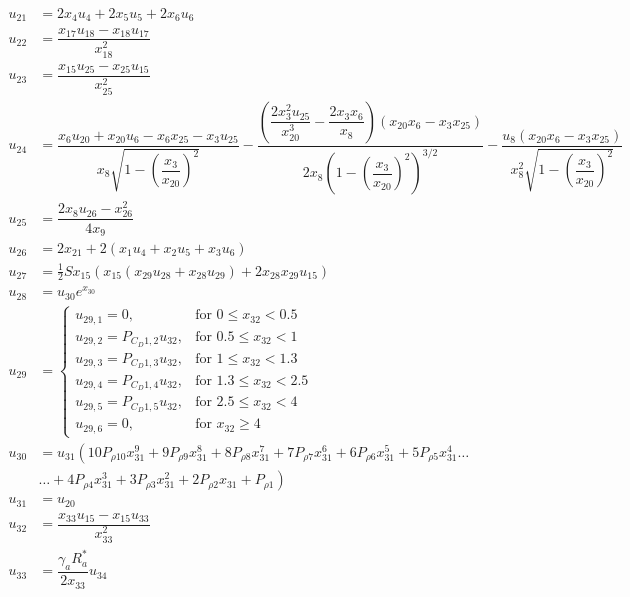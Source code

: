 \begin{equation} \label{eq:unAuxEq2}
\begin{split}
u_{21} &= 2x_{4}u_{4}+2x_{5}u_{5}+2x_{6}u_{6}\\
u_{22} &= \dfrac{x_{17}u_{18}-x_{18}u_{17}}{x_{18}^{2}}\\
u_{23} &= \dfrac{x_{15}u_{25}-x_{25}u_{15}}{x_{25}^{2}}\\
u_{24} &=  \dfrac{x_{6}u_{20}+x_{20}u_{6}-x_{6}x_{25}-x_{3}u_{25}}{x_{8}\sqrt{1-\left(\dfrac{x_{3}}{x_{20}}\right)^{2}}}-\dfrac{\left(\dfrac{2x_{3}^{2}u_{25}}{x_{20}^{3}}-\dfrac{2x_{3}x_{6}}{x_{8}}\right)\left(x_{20}x_{6}-x_{3}x_{25}\right)}{2x_{8}\left(1-\left(\dfrac{x_{3}}{x_{20}}\right)^{2}\right)^{3/2}}-\dfrac{u_{8}\left(x_{20}x_{6}-x_{3}x_{25}\right)}{x_{8}^{2}\sqrt{1-\left(\dfrac{x_{3}}{x_{20}}\right)^{2}}}\\
u_{25} &=  \dfrac{2x_{8}u_{26}-x_{26}^{2}}{4x_{9}}\\
u_{26} &=  2x_{21}+2\left(x_{1}u_{4}+x_{2}u_{5}+x_{3}u_{6}\right)\\
u_{27} &=  \frac{1}{2}Sx_{15}\left(x_{15} \left(x_{29}u_{28}+x_{28}u_{29}\right)+2x_{28}x_{29}u_{15}\right) \\
u_{28} &= u_{30}e^{x_{30}} \\
u_{29} &=\begin{cases}
u_{29,1}=0, & \text{for } 0\leq x_{32} < 0.5\\
u_{29,2}=P_{C_{D} 1,2}u_{32}, &  \text{for } 0.5\leq x_{32} < 1 \\
u_{29,3}=P_{C_{D} 1,3}u_{32}, &  \text{for } 1\leq x_{32} < 1.3 \\
u_{29,4}=P_{C_{D} 1,4}u_{32}, &  \text{for } 1.3\leq x_{32} < 2.5 \\
u_{29,5}=P_{C_{D} 1,5}u_{32}, &  \text{for } 2.5\leq x_{32} < 4 \\
u_{29,6}=0, &  \text{for } x_{32} \geq 4 
\end{cases}\\
u_{30} &=u_{31} \left(10 P_{\rho 10}x_{31}^{9}+9 P_{\rho 9}x_{31}^{8}+8 P_{\rho 8}x_{31}^{7}+7 P_{\rho 7}x_{31}^{6}+6 P_{\rho 6}x_{31}^{5}+5 P_{\rho 5}x_{31}^{4}\dots \right. \\
& \left. \dotsc +4 P_{\rho 4}x_{31}^{3}+3 P_{\rho 3}x_{31}^{2}+2 P_{\rho 2}x_{31}+P_{\rho 1}\right) \\
u_{31} &= u_{20}\\
u_{32} &= \dfrac{x_{33}u_{15}-x_{15}u_{33}}{x_{33}^{2}}\\
u_{33} &= \dfrac{\gamma_{a}R_{a}^{*}}{2x_{33}}u_{34} \\

\end{split}
\end{equation}
